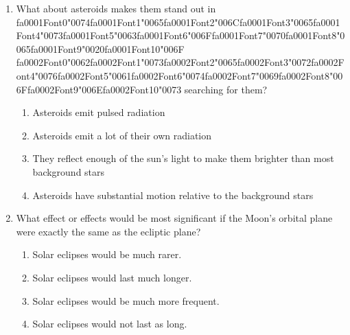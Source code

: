 \documentclass[12pt]{article}
\begin{document}
\begin{enumerate}[label=\arabic*.]
\item What about asteroids makes them stand out in {\csname fa0001Font0\endcsname\char"0074}{\csname fa0001Font1\endcsname\char"0065}{\csname fa0001Font2\endcsname\char"006C}{\csname fa0001Font3\endcsname\char"0065}{\csname fa0001Font4\endcsname\char"0073}{\csname fa0001Font5\endcsname\char"0063}{\csname fa0001Font6\endcsname\char"006F}{\csname fa0001Font7\endcsname\char"0070}{\csname fa0001Font8\endcsname\char"0065}{\csname fa0001Font9\endcsname\char"0020}{\csname fa0001Font10\endcsname\char"006F} {\csname fa0002Font0\endcsname\char"0062}{\csname fa0002Font1\endcsname\char"0073}{\csname fa0002Font2\endcsname\char"0065}{\csname fa0002Font3\endcsname\char"0072}{\csname fa0002Font4\endcsname\char"0076}{\csname fa0002Font5\endcsname\char"0061}{\csname fa0002Font6\endcsname\char"0074}{\csname fa0002Font7\endcsname\char"0069}{\csname fa0002Font8\endcsname\char"006F}{\csname fa0002Font9\endcsname\char"006E}{\csname fa0002Font10\endcsname\char"0073} searching for them?
\begin{enumerate}[label=(\alph*)]
    \item Asteroids emit pulsed radiation
    \item Asteroids emit a lot of their own radiation
    \item They reflect enough of the sun's light to make them brighter than most background stars
    \item Asteroids have substantial motion relative to the background stars
\end{enumerate}
\item What effect or effects would be most significant if the Moon's orbital plane were exactly
the same as the ecliptic plane?
\begin{enumerate}[label=(\alph*)]
    \item Solar eclipses would be much rarer.
    \item Solar eclipses would last much longer.
    \item Solar eclipses would be much more frequent.
    \item Solar eclipses would not last as long.
\end{enumerate}
\end{enumerate}
\end{document}
